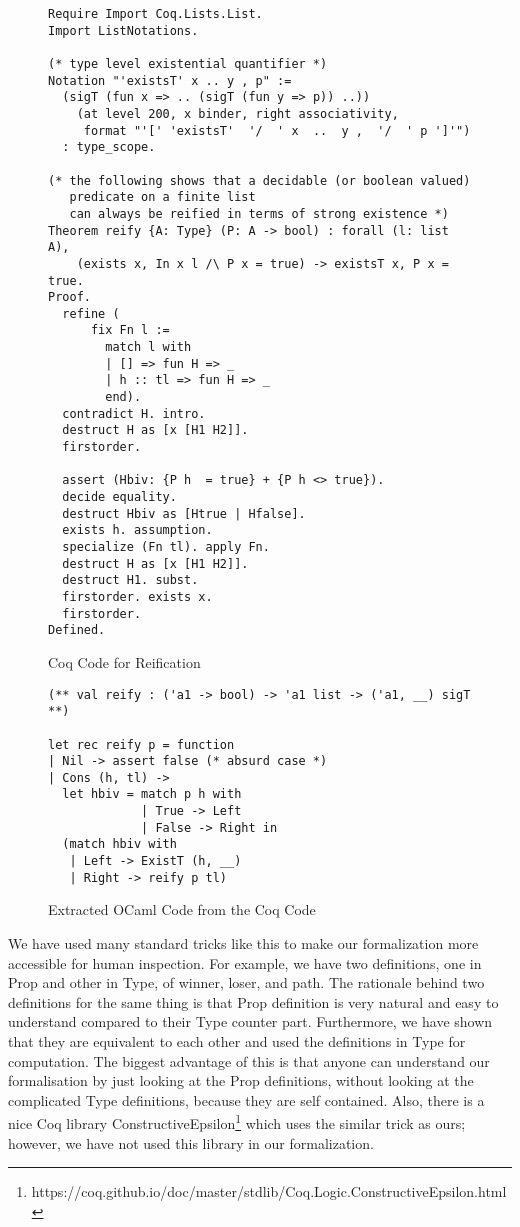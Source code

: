 \begin{figure}
  
\begin{verbatim}
Require Import Coq.Lists.List.
Import ListNotations.

(* type level existential quantifier *)
Notation "'existsT' x .. y , p" :=
  (sigT (fun x => .. (sigT (fun y => p)) ..))
    (at level 200, x binder, right associativity,
     format "'[' 'existsT'  '/  ' x  ..  y ,  '/  ' p ']'")
  : type_scope.

(* the following shows that a decidable (or boolean valued) 
   predicate on a finite list
   can always be reified in terms of strong existence *)
Theorem reify {A: Type} (P: A -> bool) : forall (l: list A), 
    (exists x, In x l /\ P x = true) -> existsT x, P x = true.
Proof.
  refine (
      fix Fn l :=
        match l with
        | [] => fun H => _
        | h :: tl => fun H => _
        end).
  contradict H. intro.
  destruct H as [x [H1 H2]].
  firstorder.

  assert (Hbiv: {P h  = true} + {P h <> true}).
  decide equality.
  destruct Hbiv as [Htrue | Hfalse].
  exists h. assumption.
  specialize (Fn tl). apply Fn.
  destruct H as [x [H1 H2]].
  destruct H1. subst.
  firstorder. exists x.
  firstorder.
Defined. 
\end{verbatim}
\caption{Coq Code for Reification}
\label{sec:coq-reif}
\end{figure}

\begin{figure}
\begin{verbatim}
(** val reify : ('a1 -> bool) -> 'a1 list -> ('a1, __) sigT **)

let rec reify p = function
| Nil -> assert false (* absurd case *)
| Cons (h, tl) ->
  let hbiv = match p h with
             | True -> Left
             | False -> Right in
  (match hbiv with
   | Left -> ExistT (h, __)
   | Right -> reify p tl)
\end{verbatim}
\caption{Extracted OCaml Code from the Coq Code}
\label{sec:ocaml-reif}
\end{figure}
    
   
   
  We have used many standard tricks like this  
  to make  our formalization more accessible for human inspection.
  For example, we have two definitions, one in Prop and other in Type, 
  of winner, loser, and path. The rationale behind two definitions for the same thing 
  is that Prop definition is very natural and easy to understand 
  compared to their Type counter part.
  Furthermore, we have shown that they are 
  equivalent to each other and used the definitions in Type for
  computation.  The biggest advantage of this is that anyone can 
  understand our formalisation by just looking at the Prop definitions,  
  without looking at the complicated Type definitions, 
   because they are self contained.   Also, there is a nice Coq library 
  ConstructiveEpsilon\footnote{https://coq.github.io/doc/master/stdlib/Coq.Logic.ConstructiveEpsilon.html}
  which uses the similar trick as ours; however, we have not used this library in 
  our formalization. 
